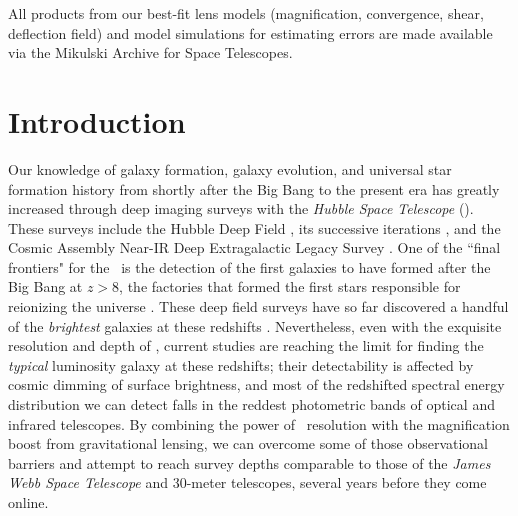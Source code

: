 All products from our best-fit lens models (magnification, convergence, shear, deflection field) and model simulations for estimating errors are made available via the Mikulski Archive for Space Telescopes. 

\section{Introduction}

Our knowledge of galaxy formation, galaxy evolution, and universal star formation history from shortly after the Big Bang to the present era has greatly increased through deep imaging surveys with the \emph{Hubble Space Telescope} (\hst). These surveys include the Hubble Deep Field \citep{Williams:1996vn}, its successive iterations \citep{Beckwith:2006rt, Bouwens:2011ys, Ellis:2013fr, Illingworth:2013yq}, and the Cosmic Assembly Near-IR Deep Extragalactic Legacy Survey \citep[CANDELS;][]{Grogin:2011ly,Koekemoer:2011fk}. One of the ``final frontiers" for the \hst\ is the detection of the first galaxies to have formed after the Big Bang at $z>8$, the factories that formed the first stars responsible for reionizing the universe \citep{Finkelstein:2012bh}. These deep field surveys have so far discovered a handful of the \emph{brightest} galaxies at these redshifts \citep{Ellis:2013fr,Oesch:2013lq}. Nevertheless, even with the exquisite resolution and depth of \hst, current studies are reaching the limit for finding the \emph{typical} luminosity galaxy at these redshifts; their detectability is affected by cosmic dimming of surface brightness, and most of the redshifted spectral energy distribution we can detect falls in the reddest photometric bands of optical and infrared telescopes. By combining the power of \hst\ resolution with the magnification boost from gravitational lensing, we can overcome some of those observational barriers and attempt to reach survey depths comparable to those of the \emph{James Webb Space Telescope} and 30-meter telescopes, several years before they come online.

